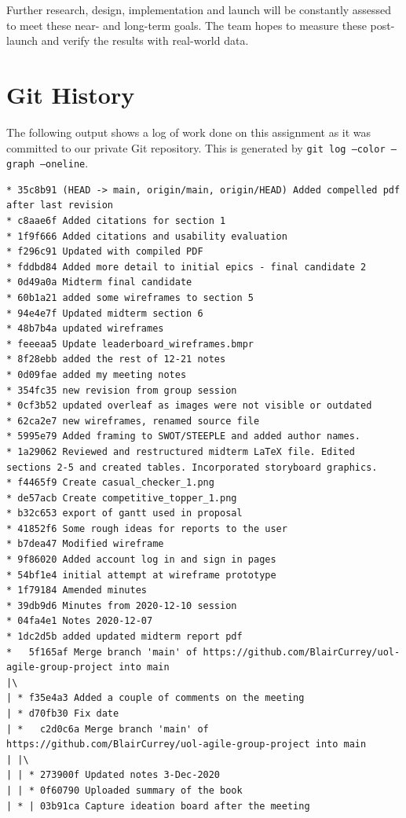 Further research, design, implementation and launch will be constantly assessed to meet these near- and long-term goals. The team hopes to measure these post-launch and verify the results with real-world data.

\newpage

 


\appendix
\appendixpage
\addappheadtotoc
\section{Git History}
The following output shows a log of work done on this assignment as it was committed to our private Git repository. This is generated by \texttt{git log --color --graph --oneline}.

\begin{verbatim}
* 35c8b91 (HEAD -> main, origin/main, origin/HEAD) Added compelled pdf after last revision
* c8aae6f Added citations for section 1
* 1f9f666 Added citations and usability evaluation
* f296c91 Updated with compiled PDF
* fddbd84 Added more detail to initial epics - final candidate 2
* 0d49a0a Midterm final candidate
* 60b1a21 added some wireframes to section 5
* 94e4e7f Updated midterm section 6
* 48b7b4a updated wireframes
* feeeaa5 Update leaderboard_wireframes.bmpr
* 8f28ebb added the rest of 12-21 notes
* 0d09fae added my meeting notes
* 354fc35 new revision from group session
* 0cf3b52 updated overleaf as images were not visible or outdated
* 62ca2e7 new wireframes, renamed source file
* 5995e79 Added framing to SWOT/STEEPLE and added author names.
* 1a29062 Reviewed and restructured midterm LaTeX file. Edited sections 2-5 and created tables. Incorporated storyboard graphics.
* f4465f9 Create casual_checker_1.png
* de57acb Create competitive_topper_1.png
* b32c653 export of gantt used in proposal
* 41852f6 Some rough ideas for reports to the user
* b7dea47 Modified wireframe
* 9f86020 Added account log in and sign in pages
* 54bf1e4 initial attempt at wireframe prototype
* 1f79184 Amended minutes
* 39db9d6 Minutes from 2020-12-10 session
* 04fa4e1 Notes 2020-12-07
* 1dc2d5b added updated midterm report pdf
*   5f165af Merge branch 'main' of https://github.com/BlairCurrey/uol-agile-group-project into main
|\
| * f35e4a3 Added a couple of comments on the meeting
| * d70fb30 Fix date
| *   c2d0c6a Merge branch 'main' of https://github.com/BlairCurrey/uol-agile-group-project into main
| |\
| | * 273900f Updated notes 3-Dec-2020
| | * 0f60790 Uploaded summary of the book
| * | 03b91ca Capture ideation board after the meeting

\end{verbatim}

